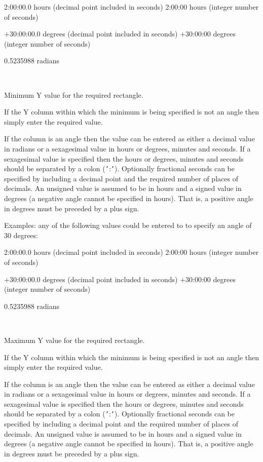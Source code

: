 \documentclass[twoside,11pt]{article}
\renewcommand{\_}{\texttt{\symbol{95}}}
\newcommand{\sstsubsection}[1]{ \item[{#1}] \mbox{} \\}
\newcommand{\sstsubsection}[1]{\item[{#1}]}
\begin{document}
\begin{htmlonly}
{{{             2:00:00.0   hours (decimal point included in seconds)
             2:00:00     hours (integer number of seconds)

           $+$30:00:00.0   degrees (decimal point included in seconds)
           $+$30:00:00     degrees (integer number of seconds)

             0.5235988   radians
      }
      \sstsubsection{
         YMIN  =  DOUBLE (read)
      }{
         Minimum Y value for the required rectangle.

         If the Y column within which the minimum is being specified is
         not an angle then simply enter the required value.

         If the column is an angle then the value can be entered as
         either a decimal value in radians or a sexagesimal value in
         hours or degrees, minutes and seconds.  If a sexagesimal value
         is specified then the hours or degrees, minutes and seconds
         should be separated by a colon ({\tt '}:{\tt '}).  Optionally fractional
         seconds can be specified by including a decimal point and the
         required number of places of decimals.  An unsigned value is
         assumed to be in hours and a signed value in degrees (a
         negative angle cannot be specified in hours).  That is,
         a positive angle in degrees must be preceded by a plus sign.

         Examples: any of the following values could be entered to
         to specify an angle of 30 degrees:

             2:00:00.0   hours (decimal point included in seconds)
             2:00:00     hours (integer number of seconds)

           $+$30:00:00.0   degrees (decimal point included in seconds)
           $+$30:00:00     degrees (integer number of seconds)

             0.5235988   radians
      }
      \sstsubsection{
         YMAX  =  DOUBLE (read)
      }{
         Maximum Y value for the required rectangle.

         If the Y column within which the minimum is being specified is
         not an angle then simply enter the required value.

         If the column is an angle then the value can be entered as
         either a decimal value in radians or a sexagesimal value in
         hours or degrees, minutes and seconds.  If a sexagesimal value
         is specified then the hours or degrees, minutes and seconds
         should be separated by a colon ({\tt '}:{\tt '}).  Optionally fractional
         seconds can be specified by including a decimal point and the
         required number of places of decimals.  An unsigned value is
         assumed to be in hours and a signed value in degrees (a
         negative angle cannot be specified in hours).  That is,
         a positive angle in degrees must be preceded by a plus sign.

}}}
\end{htmlonly}
\end{document}
